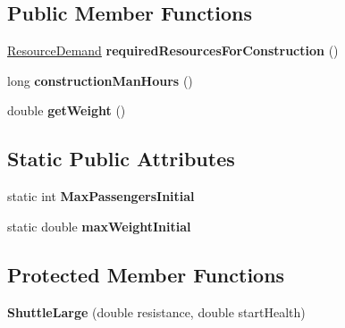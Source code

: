 \subsection*{Public Member Functions}
\begin{DoxyCompactItemize}
\item 
\hyperlink{classuniverse_1_1_resource_demand}{Resource\+Demand} {\bfseries required\+Resources\+For\+Construction} ()\hypertarget{classtools_1_1vehicles_1_1space_1_1_shuttle_large_a3677d35b8dd5931ff9f1987c98bff605}{}\label{classtools_1_1vehicles_1_1space_1_1_shuttle_large_a3677d35b8dd5931ff9f1987c98bff605}

\item 
long {\bfseries construction\+Man\+Hours} ()\hypertarget{classtools_1_1vehicles_1_1space_1_1_shuttle_large_a7618c6eceda2255d0099c2d3a57befe4}{}\label{classtools_1_1vehicles_1_1space_1_1_shuttle_large_a7618c6eceda2255d0099c2d3a57befe4}

\item 
double {\bfseries get\+Weight} ()\hypertarget{classtools_1_1vehicles_1_1space_1_1_shuttle_large_a5fcc8359ad8f099b37d528e314ff7d3c}{}\label{classtools_1_1vehicles_1_1space_1_1_shuttle_large_a5fcc8359ad8f099b37d528e314ff7d3c}

\end{DoxyCompactItemize}
\subsection*{Static Public Attributes}
\begin{DoxyCompactItemize}
\item 
static int {\bfseries Max\+Passengers\+Initial}\hypertarget{classtools_1_1vehicles_1_1space_1_1_shuttle_large_a22ac2a154abdbf7b6ae6a349e165dac9}{}\label{classtools_1_1vehicles_1_1space_1_1_shuttle_large_a22ac2a154abdbf7b6ae6a349e165dac9}

\item 
static double {\bfseries max\+Weight\+Initial}\hypertarget{classtools_1_1vehicles_1_1space_1_1_shuttle_large_aa03dbb553782a9bfbb270d4fcfa07ab6}{}\label{classtools_1_1vehicles_1_1space_1_1_shuttle_large_aa03dbb553782a9bfbb270d4fcfa07ab6}

\end{DoxyCompactItemize}
\subsection*{Protected Member Functions}
\begin{DoxyCompactItemize}
\item 
{\bfseries Shuttle\+Large} (double resistance, double start\+Health)\hypertarget{classtools_1_1vehicles_1_1space_1_1_shuttle_large_a95245ff51f627037eeab2fa3a8481950}{}\label{classtools_1_1vehicles_1_1space_1_1_shuttle_large_a95245ff51f627037eeab2fa3a8481950}

\end{DoxyCompactItemize}
